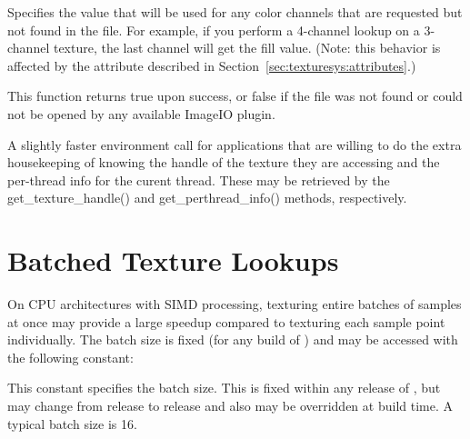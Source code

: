 \vspace{-24pt}
\vspace{10pt}
Specifies the value that will be used for any color channels that are
requested but not found in the file.  For example, if you perform a
4-channel lookup on a 3-channel texture, the last channel will
get the fill value.  (Note: this behavior is affected by the
 attribute described in 
Section~\ref{sec:texturesys:attributes}.)
\apiend

This function returns {\cf true} upon success, or {\cf false} if the
file was not found or could not be opened by any available ImageIO
plugin.
\apiend

A slightly faster {\cf environment} call for applications that are willing
to do the extra housekeeping of knowing the handle of the texture they
are accessing and the per-thread info for the curent thread.  These
may be retrieved by the {\cf get_texture_handle()} and 
{\cf get_perthread_info()} methods, respectively.
\apiend



\section{Batched Texture Lookups}
\label{sec:texturesys:api:batched}
 

On CPU architectures with SIMD processing, texturing entire batches of
samples at once may provide a large speedup compared to texturing each
sample point individually. The batch size is fixed (for any build of
\product) and may be accessed with the following constant:

This constant specifies the batch size. This is fixed within any release
of \product, but may change from release to release and also may be
overridden at build time. A typical batch size is 16.
\apiend

